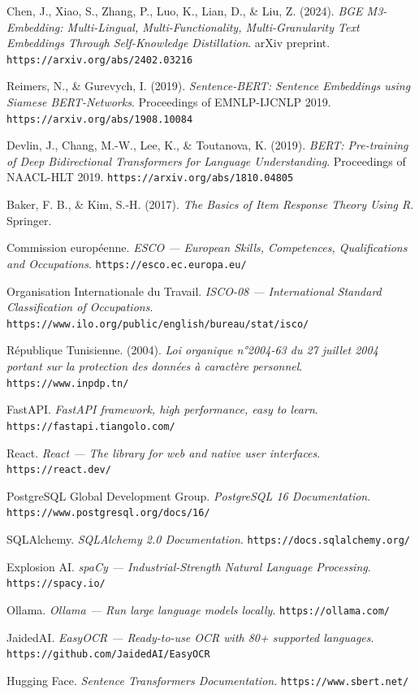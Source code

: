 \documentclass[12pt,a4paper]{report}
\begin{document}
\begin{enumerate}[label={[\arabic*]}]
  \item Chen, J., Xiao, S., Zhang, P., Luo, K., Lian, D., \& Liu, Z. (2024). \textit{BGE M3-Embedding: Multi-Lingual, Multi-Functionality, Multi-Granularity Text Embeddings Through Self-Knowledge Distillation}. arXiv preprint. \texttt{https://arxiv.org/abs/2402.03216}
  \item Reimers, N., \& Gurevych, I. (2019). \textit{Sentence-BERT: Sentence Embeddings using Siamese BERT-Networks}. Proceedings of EMNLP-IJCNLP 2019. \texttt{https://arxiv.org/abs/1908.10084}
  \item Devlin, J., Chang, M.-W., Lee, K., \& Toutanova, K. (2019). \textit{BERT: Pre-training of Deep Bidirectional Transformers for Language Understanding}. Proceedings of NAACL-HLT 2019. \texttt{https://arxiv.org/abs/1810.04805}
  \item Baker, F. B., \& Kim, S.-H. (2017). \textit{The Basics of Item Response Theory Using R}. Springer. 
  \item Commission européenne. \textit{ESCO — European Skills, Competences, Qualifications and Occupations}. \texttt{https://esco.ec.europa.eu/}
  \item Organisation Internationale du Travail. \textit{ISCO-08 — International Standard Classification of Occupations}. \texttt{https://www.ilo.org/public/english/bureau/stat/isco/}
  \item République Tunisienne. (2004). \textit{Loi organique n°2004-63 du 27 juillet 2004 portant sur la protection des données à caractère personnel}. \texttt{https://www.inpdp.tn/}
  \item FastAPI. \textit{FastAPI framework, high performance, easy to learn}. \texttt{https://fastapi.tiangolo.com/}
  \item React. \textit{React — The library for web and native user interfaces}. \texttt{https://react.dev/}
  \item PostgreSQL Global Development Group. \textit{PostgreSQL 16 Documentation}. \texttt{https://www.postgresql.org/docs/16/}
  \item SQLAlchemy. \textit{SQLAlchemy 2.0 Documentation}. \texttt{https://docs.sqlalchemy.org/}
  \item Explosion AI. \textit{spaCy — Industrial-Strength Natural Language Processing}. \texttt{https://spacy.io/}
  \item Ollama. \textit{Ollama — Run large language models locally}. \texttt{https://ollama.com/}
  \item JaidedAI. \textit{EasyOCR — Ready-to-use OCR with 80+ supported languages}. \texttt{https://github.com/JaidedAI/EasyOCR}
  \item Hugging Face. \textit{Sentence Transformers Documentation}. \texttt{https://www.sbert.net/}
\end{enumerate}
\end{document}
